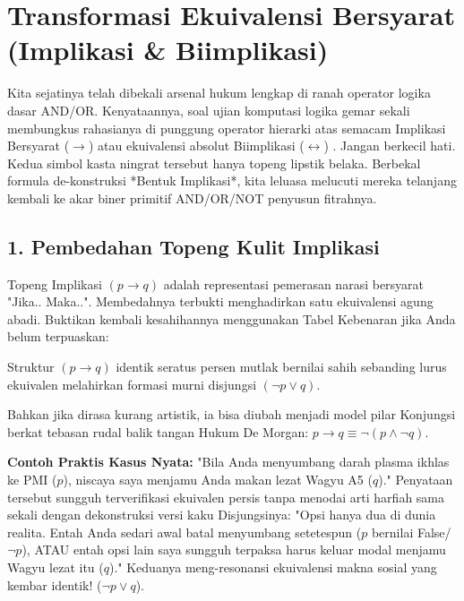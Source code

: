 \section{Transformasi Ekuivalensi Bersyarat (Implikasi \& Biimplikasi)}

Kita sejatinya telah dibekali arsenal hukum lengkap di ranah operator logika dasar AND/OR. Kenyataannya, soal ujian komputasi logika gemar sekali membungkus rahasianya di punggung operator hierarki atas semacam Implikasi Bersyarat ($\rightarrow$) atau ekuivalensi absolut Biimplikasi ($\leftrightarrow$) \cite{rosen2019}. Jangan berkecil hati. Kedua simbol kasta ningrat tersebut hanya topeng lipstik belaka. Berbekal formula de-konstruksi *Bentuk Implikasi*, kita leluasa melucuti mereka telanjang kembali ke akar biner primitif AND/OR/NOT penyusun fitrahnya.

\subsection{1. Pembedahan Topeng Kulit Implikasi}

Topeng Implikasi $(p \rightarrow q)$ adalah representasi pemerasan narasi bersyarat "Jika.. Maka..". Membedahnya terbukti menghadirkan satu ekuivalensi agung abadi. Buktikan kembali kesahihannya menggunakan Tabel Kebenaran jika Anda belum terpuaskan:

\begin{teorema}
Struktur $(p \rightarrow q)$ identik seratus persen mutlak bernilai sahih sebanding lurus ekuivalen melahirkan formasi murni disjungsi $(\neg p \vee q)$.
\end{teorema}

Bahkan jika dirasa kurang artistik, ia bisa diubah menjadi model pilar Konjungsi berkat tebasan rudal balik tangan Hukum De Morgan: \textbf{$p \rightarrow q \equiv \neg (p \wedge \neg q)$}.

\textbf{Contoh Praktis Kasus Nyata:}
"Bila Anda menyumbang darah plasma ikhlas ke PMI ($p$), niscaya saya menjamu Anda makan lezat Wagyu A5 ($q$)." 
Penyataan tersebut sungguh terverifikasi ekuivalen persis tanpa menodai arti harfiah sama sekali dengan dekonstruksi versi kaku Disjungsinya:
"Opsi hanya dua di dunia realita. Entah Anda sedari awal batal menyumbang setetespun ($p$ bernilai False/ $\neg p$), ATAU entah opsi lain saya sungguh terpaksa harus keluar modal menjamu Wagyu lezat itu ($q$)." Keduanya meng-resonansi ekuivalensi makna sosial yang kembar identik! ($\neg p \vee q$).

